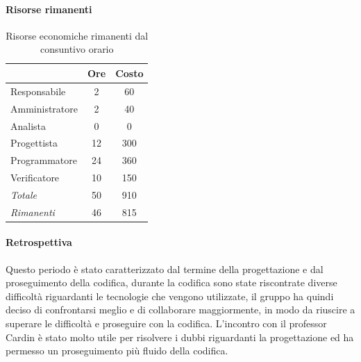 \documentclass[a4paper,12pt]{article}
\begin{document}
            \paragraph{Risorse rimanenti}
                \begin{table}[H]
                \centering
                \caption{Risorse economiche rimanenti dal consuntivo orario}
                \begin{tabular}{|l|c|c|}
                \hline
                    \rowcolor{lightgray}{\textbf{Ruolo}} & {\textbf{Ore}} & {\textbf{Costo}}\\
                \hline
                    Responsabile & 2 & 60\\
                \hline
                    Amministratore & 2 & 40\\
                \hline
                    Analista & 0 & 0\\
                \hline
                    Progettista & 12 & 300\\
                \hline
                    Programmatore & 24 & 360\\
                \hline
                    Verificatore & 10 & 150\\
                \hline
                    \rowcolor{lightgray}\textit{Totale} & 50 & 910\\
                \hline
                    \rowcolor{lightgray}\textit{Rimanenti} & 46 & 815\\
                \hline
                \end{tabular}
                \end{table}
                
            \paragraph{Retrospettiva}
            Questo periodo è stato caratterizzato dal termine della progettazione e dal proseguimento della codifica, durante la codifica sono state riscontrate diverse difficoltà riguardanti le tecnologie che vengono utilizzate, il gruppo ha quindi deciso di confrontarsi meglio e di collaborare maggiormente, in modo da riuscire a superare le difficoltà e proseguire con la codifica.
            L'incontro con il professor Cardin è stato molto utile per risolvere i dubbi riguardanti la progettazione ed ha permesso un proseguimento più fluido della codifica.

                    
\end{document}
